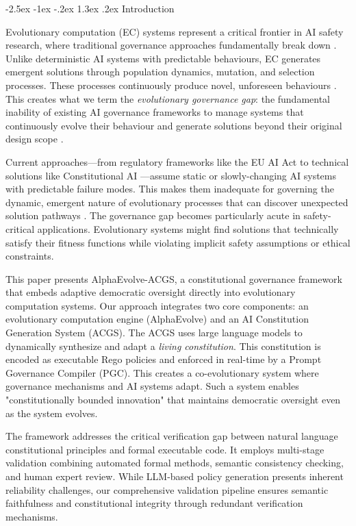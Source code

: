 \documentclass[manuscript,screen,review,anonymous,9pt]{acmart}
\makeatletter
\renewcommand\section{\@startsection{section}{1}{\z@}%
  {-2.5ex \@plus -1ex \@minus -.2ex}%
  {1.3ex \@plus.2ex}%
  {\normalfont\Large\bfseries}}
\makeatother
\begin{document}
\section{Introduction}
\label{sec:introduction}

Evolutionary computation (EC) systems represent a critical frontier in AI safety research, where traditional governance approaches fundamentally break down \cite{Chauhan2025ECLLMSurvey}. Unlike deterministic AI systems with predictable behaviours, EC generates emergent solutions through population dynamics, mutation, and selection processes. These processes continuously produce novel, unforeseen behaviours \cite{Nordin2024LLMGP}. This creates what we term the \textit{evolutionary governance gap}: the fundamental inability of existing AI governance frameworks to manage systems that continuously evolve their behaviour and generate solutions beyond their original design scope \cite{Taeihagh2025Governing, WorldBank2024AIGovernance}.

Current approaches---from regulatory frameworks like the EU AI Act to technical solutions like Constitutional AI \cite{Bai2025ConstitutionalAI}---assume static or slowly-changing AI systems with predictable failure modes. This makes them inadequate for governing the dynamic, emergent nature of evolutionary processes that can discover unexpected solution pathways \cite{StanfordJBLP2024AIGovernanceWeb3, StanfordLaw2025BulletProof}. The governance gap becomes particularly acute in safety-critical applications. Evolutionary systems might find solutions that technically satisfy their fitness functions while violating implicit safety assumptions or ethical constraints.

This paper presents AlphaEvolve-ACGS, a constitutional governance framework that embeds adaptive democratic oversight directly into evolutionary computation systems. Our approach integrates two core components: an evolutionary computation engine (AlphaEvolve) and an AI Constitution Generation System (ACGS). The ACGS uses large language models to dynamically synthesize and adapt a \textit{living constitution}. This constitution is encoded as executable Rego policies and enforced in real-time by a Prompt Governance Compiler (PGC). This creates a co-evolutionary system where governance mechanisms and AI systems adapt. Such a system enables "constitutionally bounded innovation" that maintains democratic oversight even as the system evolves.

The framework addresses the critical verification gap between natural language constitutional principles and formal executable code. It employs multi-stage validation combining automated formal methods, semantic consistency checking, and human expert review. While LLM-based policy generation presents inherent reliability challenges, our comprehensive validation pipeline ensures semantic faithfulness and constitutional integrity through redundant verification mechanisms.
\end{document}
